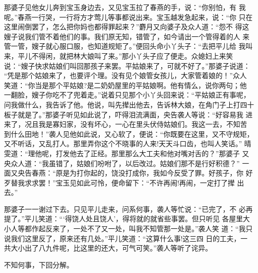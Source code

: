 那婆子见他女儿奔到宝玉身边去，又见宝玉拉了春燕的手，说：“你别怕，有
我呢。”春燕一行哭，一行将方才莺儿等事都说出来。宝玉越发急起来，说：“你
只在这里闹倒罢了，怎么把你妈也都得罪起来？”麝月又向婆子及众人道：“怨不
得这嫂子说我们管不着他们的事。我们原无知，错管了，如今请出一个管得着的人
来管一管，嫂子就心服口服，也知道规矩了。”便回头命小丫头子：“去把平儿给
我叫来，平儿不得闲，就把林大娘叫了来。”那小丫头子应了便走。众媳妇上来笑
说：“嫂子快求姑娘们叫回那孩子来罢。平姑娘来了，可就不好了。”那婆子说道：
“凭是那个姑娘来了，也要评个理。没有见个娘管女孩儿，大家管着娘的！”众人
笑道：“你当是那个平姑娘?是二奶奶屋里的平姑娘啊。他有情么，说你两句；他
一翻脸，嫂子你吃不了兜着走。”说着只见那个小丫头回来说：“平姑娘正有事呢，
问我做什么，我告诉了他。他说，叫先撵出他去，告诉林大娘，在角门子上打四十
板子就是了。”那婆子听见如此说了，吓得泪流满面，央告袭人等说：“好容易我
进来了，况且我是寡妇家，没有坏心，一心在里头伏侍姑娘们。我这一去，不知苦
到什么田地！”袭人见他如此说，又心软了，便说：“你既要在这里，又不守规矩，
又不听话，又乱打人。那里弄你这个不晓事的人来!天天斗口齿，也叫人笑话。”
晴雯道：“理他呢，打发他去了正经。那里那么大工夫和他对嘴对舌的？”那婆子
又央众人道：“我虽错了，姑娘们吩咐了，以后改过。姑娘们那不是行好积德？”
一面又央告春燕：“原是为打你起的，饶没打成你，我如今反受了罪。好孩子，你
好歹替我求求罢！”宝玉见如此可怜，便命留下：“不许再闹!再闹，一定打了撵
出去。”

那婆子一一谢过下去。只见平儿走来，问系何事，袭人等忙说：“已完了，不
必再提了。”平儿笑道：“‘得饶人处且饶人’，得将就的就省些事罢。但只听见
各屋里大小人等都作起反来了，一处不了又一处，叫我不知管那一处是。”袭人笑
道：“我只说我们这里反了，原来还有几处。”平儿笑道：“这算什么事!这三四
日的工夫，一共大小出了八九件呢，比这里的还大，可气可笑。”袭人等听了诧异。

不知何事，下回分解。